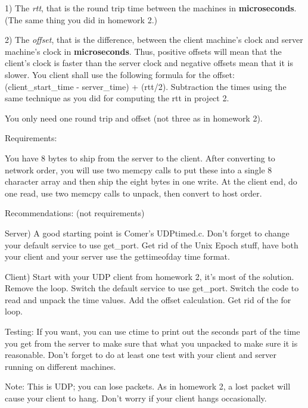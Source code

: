 1) The {\it rtt}, that is the round trip time between the machines
in {\bf microseconds}. (The same thing you did in homework 2.)

2) The {\it offset}, that is the difference,
between the client machine's clock and server machine's clock in 
{\bf microseconds}.
Thus, positive offsets will mean that the client's clock is faster than the 
server clock and negative offsets mean that it is slower.
You client shall use the following formula for the offset:
\hfill\break
{\ltt{}(client_start_time - server_time) + (rtt/2)}.
Subtraction the times using the same technique as you did for computing
the rtt in project 2.

You only need one round trip and offset (not three as in homework 2).

Requirements:

You have 8 bytes to ship from the server to the client.
After converting to network order, you will use two 
{\ltt{}memcpy} calls to put these
into a single 8 character array and then ship the eight bytes in one write.
At the client end, do one read, use two {\ltt{}memcpy} calls to unpack,
then convert to host order.

\bigskip
Recommendations: (not requirements)

Server)
A good starting point is Comer's {\ltt{}UDPtimed.c}.
Don't forget to change your default {\ltt{}service} to use
{\ltt{}get_port}.
Get rid of the Unix Epoch stuff, have both your client and your server
use the {\ltt{}gettimeofday} time format.

Client) 
Start with your UDP client from homework 2, it's most of the solution.
Remove the loop.
Switch the default service to use {\ltt{}get_port}.
Switch the code to read and unpack the time values.
Add the offset calculation.
Get rid of the {\ltt{}for} loop.

Testing:
If you want, you can use {\ltt{}ctime} to print out the seconds part of
the time you get from the server to make sure that what you unpacked
to make sure it is reasonable. Don't forget to do at least one test
with your client and server running on different machines.

Note:
This is UDP; you can lose packets.
As in homework 2, a lost packet will cause your client to hang.
Don't worry if your client hangs occasionally.


\bye
